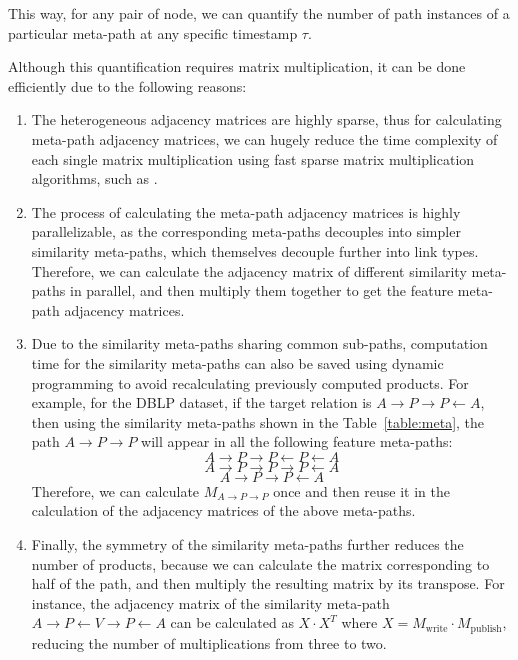 This way, for any pair of node, we can quantify the number of path instances of a particular meta-path at any specific timestamp $\tau$. {\color{red}Although this quantification requires matrix multiplication, it can be done efficiently due to the following reasons:
\begin{enumerate}
\item The heterogeneous adjacency matrices are highly sparse, thus for calculating meta-path adjacency matrices, we can hugely reduce the time complexity of each single matrix multiplication using fast sparse matrix multiplication algorithms, such as \cite{horowitz1983fundamentals}.
\item The process of calculating the meta-path adjacency matrices is highly parallelizable, as the corresponding meta-paths decouples into simpler similarity meta-paths, which themselves decouple further into link types. Therefore, we can calculate the adjacency matrix of different similarity meta-paths in parallel, and then multiply them together to get the feature meta-path adjacency matrices.
\item Due to the similarity meta-paths sharing common sub-paths, computation time for the similarity meta-paths can also be saved using dynamic programming to avoid recalculating previously computed products. For example, for the DBLP dataset, if the target relation is $A\rightarrow P\rightarrow P\leftarrow A$, then using the similarity meta-paths shown in the Table~\ref{table:meta}, the path $A\rightarrow P\rightarrow P$ will appear in all the following feature meta-paths:
\[A\rightarrow P\rightarrow P\leftarrow P\leftarrow A\]
\[A\rightarrow P\rightarrow P\rightarrow P\leftarrow A\]
\[A\rightarrow P\rightarrow P\leftarrow A\]
Therefore, we can calculate $M_{A\rightarrow P\rightarrow P}$ once and then reuse it in the calculation of the adjacency matrices of the above meta-paths.

\item Finally, the symmetry of the similarity meta-paths further reduces the number of products, because we can calculate the matrix corresponding to half of the path, and then multiply the resulting matrix by its transpose. For instance, the adjacency matrix of the similarity meta-path $A\rightarrow P\leftarrow V\rightarrow P\leftarrow A$ can be calculated as $X\cdot X^T$ where $X=M_{\text{write}}\cdot M_{\text{publish}}$, reducing the number of multiplications from three to two.
\end{enumerate}
}


